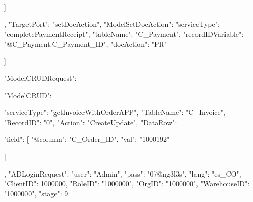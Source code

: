 {{{{{{                     ]
                      }

                    }

                    },
                    {
                    "TargetPort": "setDocAction",                      
                    "ModelSetDocAction": {
                        "serviceType": "completePaymentReceipt",
                        "tableName": "C_Payment",
                        "recordIDVariable": "@C_Payment.C_Payment_ID",
                        "docAction": "PR"
                    }
                    }


                  ]
              }

          
    }
}






{
    "ModelCRUDRequest": {
        "ModelCRUD": {
            "serviceType": "getInvoiceWithOrderAPP",
            "TableName": "C_Invoice",
            "RecordID": "0",
            "Action": "CreateUpdate",
            "DataRow": {
                "field": [
                    {
                        "@column": "C_Order_ID",
                        "val": "1000192"
                    }
                
                ]
            }
        },
        "ADLoginRequest": {
            "user": "Admin",
            "pass": "07@ng3l3s",
            "lang": "es_CO",
            "ClientID": 1000000,
            "RoleID": "1000000",
            "OrgID": "1000000",
            "WarehouseID": "1000000",
            "stage": 9
        }
    }
}





























